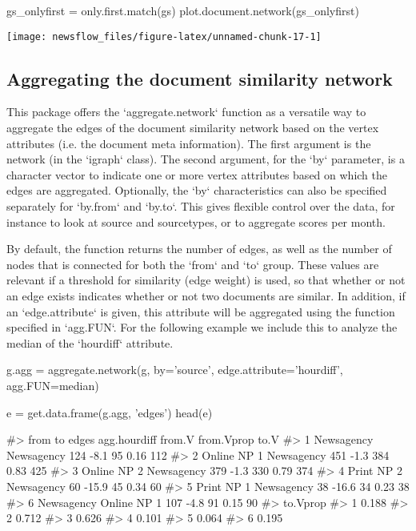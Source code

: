 \begin{Schunk}
\begin{Sinput}
gs_onlyfirst = only.first.match(gs)
plot.document.network(gs_onlyfirst)
\end{Sinput}

\texttt{[image: newsflow\_files/figure-latex/unnamed-chunk-17-1]} \end{Schunk}

\subsection{Aggregating the document similarity network}

This package offers the  `aggregate.network` function as a versatile way to aggregate the edges of the document similarity network based on the vertex attributes (i.e. the document meta information).
The first argument is the network (in the `igraph` class). 
The second argument, for the `by` parameter, is a character vector to indicate one or more vertex attributes based on which the edges are aggregated.
Optionally, the `by` characteristics can also be specified separately for `by.from` and `by.to`. 
This gives flexible control over the data, for instance to look at source and sourcetypes, or to aggregate scores per month.

By default, the function returns the number of edges, as well as the number of nodes that is connected for both the `from` and `to` group. 
These values are relevant if a threshold for similarity (edge weight) is used, so that whether or not an edge exists indicates whether or not two documents are similar.
In addition, if an `edge.attribute` is given, this attribute will be aggregated using the function specified in `agg.FUN`.
For the following example we include this to analyze the median of the `hourdiff` attribute.

\begin{Schunk}
\begin{Sinput}
g.agg = aggregate.network(g, by='source', edge.attribute='hourdiff', agg.FUN=median)

e = get.data.frame(g.agg, 'edges')
head(e)
\end{Sinput}
\begin{Soutput}
#>          from          to edges agg.hourdiff from.V from.Vprop to.V
#> 1  Newsagency  Newsagency   124         -8.1     95       0.16  112
#> 2 Online NP 1  Newsagency   451         -1.3    384       0.83  425
#> 3 Online NP 2  Newsagency   379         -1.3    330       0.79  374
#> 4  Print NP 2  Newsagency    60        -15.9     45       0.34   60
#> 5  Print NP 1  Newsagency    38        -16.6     34       0.23   38
#> 6  Newsagency Online NP 1   107         -4.8     91       0.15   90
#>   to.Vprop
#> 1    0.188
#> 2    0.712
#> 3    0.626
#> 4    0.101
#> 5    0.064
#> 6    0.195
\end{Soutput}
\end{Schunk}

